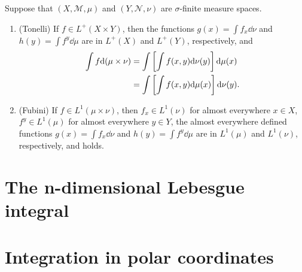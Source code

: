 \begin{theorem}
    Suppose that $(X, \mathcal{M}, \mu)$ and $(Y, \mathcal{N}, \nu)$ are $\sigma$-finite measure spaces.
    \begin{enumerate}
        \item (Tonelli) If $f \in L^+(X \times Y)$, then the functions $g(x) = \int f_x \dd \nu$ and $h(y) = \int f^y \dd \mu$ are in $L^+(X)$ and $L^+(Y)$, respectively, and
        \begin{align}
            \int f \dd (\mu \times \nu) &= \int \left[ \int f(x, y) \dd \nu(y) \right] \dd \mu(x) \labeq{Tonelli} \\
            &= \int \left[ \int f(x, y) \dd \mu(x) \right] \dd \nu(y). \nonumber
        \end{align}
        \item (Fubini) If $f \in L^1(\mu \times \nu)$, then $f_x \in L^1(\nu)$ for almost everywhere $x \in X$, $f^y \in L^1(\mu)$ for almost everywhere $y \in Y$, the almost everywhere defined functions $g(x) = \int f_x \dd \nu$ and $h(y) = \int f^y \dd \mu$ are in $L^1(\mu)$ and $L^1(\nu)$, respectively, and  holds.
    \end{enumerate}
\end{theorem}

\begin{theorem}
    
\end{theorem}

\section{The n-dimensional Lebesgue integral}

\section{Integration in polar coordinates}

